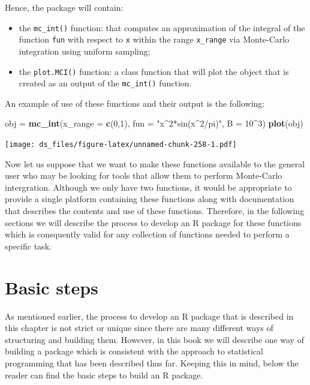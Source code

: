\documentclass[12pt,]{krantz}
\newenvironment{Shaded}{\begin{snugshade}}{\end{snugshade}}
\newcommand{\KeywordTok}[1]{\textcolor[rgb]{0.27,0.27,0.27}{\textbf{#1}}}
\newcommand{\DataTypeTok}[1]{\textcolor[rgb]{0.27,0.27,0.27}{#1}}
\newcommand{\DecValTok}[1]{\textcolor[rgb]{0.06,0.06,0.06}{#1}}
\newcommand{\StringTok}[1]{\textcolor[rgb]{0.5,0.5,0.5}{#1}}
\newcommand{\OperatorTok}[1]{\textcolor[rgb]{0.43,0.43,0.43}{\textbf{#1}}}
\newcommand{\NormalTok}[1]{#1}
\providecommand{\tightlist}{%
  \setlength{\itemsep}{0pt}\setlength{\parskip}{0pt}}
\begin{document}
Hence, the package will contain:

\begin{itemize}
\tightlist
\item
  the \texttt{mc\_int()} function: that computes an approximation of the
  integral of the function \texttt{fun} with respect to \texttt{x}
  within the range \texttt{x\_range} via Monte-Carlo integration using
  uniform sampling;
\item
  the \texttt{plot.MCI()} function: a class function that will plot the
  object that is created as an output of the \texttt{mc\_int()}
  function.
\end{itemize}

An example of use of these functions and their output is the following:

\begin{Shaded}
\begin{Highlighting}[]
\NormalTok{obj =}\StringTok{ }\KeywordTok{mc_int}\NormalTok{(}\DataTypeTok{x_range =} \KeywordTok{c}\NormalTok{(}\DecValTok{0}\NormalTok{,}\DecValTok{1}\NormalTok{), }\DataTypeTok{fun =} \StringTok{"x^2*sin(x^2/pi)"}\NormalTok{, }\DataTypeTok{B =} \DecValTok{10}\OperatorTok{^}\DecValTok{3}\NormalTok{)}
\KeywordTok{plot}\NormalTok{(obj)}
\end{Highlighting}
\end{Shaded}

\texttt{[image: ds\_files/figure-latex/unnamed-chunk-258-1.pdf]}

Now let us suppose that we want to make these functions available to the
general user who may be looking for tools that allow them to perform
Monte-Carlo intergration. Although we only have two functions, it would
be appropriate to provide a single platform containing these functions
along with documentation that describes the contents and use of these
functions. Therefore, in the following sections we will describe the
process to develop an R package for these functions which is consquently
valid for any collection of functions needed to perform a specific task.

\section{Basic steps}\label{basic-steps}

As mentioned earlier, the process to develop an R package that is
described in this chapter is not strict or unique since there are many
different ways of structuring and building them. However, in this book
we will describe one way of building a package which is consistent with
the approach to statistical programming that has been described thus
far. Keeping this in mind, below the reader can find the basic steps to
build an R package.
\end{document}
